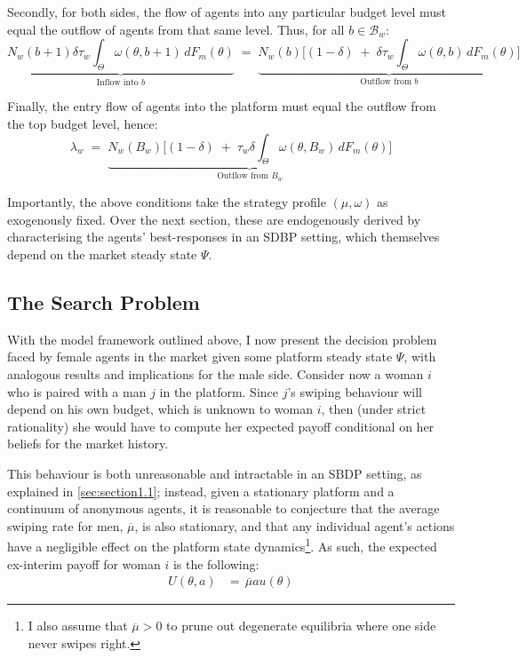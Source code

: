 Secondly, for both sides, the flow of agents into any particular budget level must equal the outflow of agents from that same level. Thus, for all $b\in\mathcal{B}_w$: 
\begin{equation}\label{eq:ss2} 
    \underbrace{N_w(b+1) \delta \tau_w \int_{\Theta} \omega(\theta,b+1)\,dF_{m}(\theta)}_{\text{Inflow into $b$}} \;=\; \underbrace{N_w(b) \Big[ (1-\delta) \;+\; \delta \tau_w\int_{\Theta} \omega(\theta,b)\,dF_{m}(\theta)\Big]}_{\text{Outflow from $b$}}
\end{equation}

Finally, the entry flow of agents into the platform must equal the outflow from the top budget level, hence: 
\begin{equation}\label{eq:ss3} 
    \lambda_w \;=\; \underbrace{N_w(B_w) \Big[ (1-\delta) \;+\; \tau_w \delta \int_{\Theta} \omega(\theta,B_w)\,dF_{m}(\theta) \Big]}_{\text{Outflow from $B_w$}}
\end{equation} 

Importantly, the above conditions take the strategy profile $(\mu,\omega)$ as exogenously fixed. Over the next section, these are endogenously derived by characterising the agents’ best-responses in an SDBP setting, which themselves depend on the market steady state $\Psi$.

\subsection{The Search Problem}\label{sec:section2.3}
With the model framework outlined above, I now present the decision problem faced by female agents in the market given some platform steady state $\Psi$, with analogous results and implications for the male side. 
Consider now a woman $i$ who is paired with a man $j$ in the platform. Since $j$'s swiping behaviour will depend on his own budget, which is unknown to woman $i$, then (under strict rationality) she would have to compute her expected payoff conditional on her beliefs for the market history.

This behaviour is both unreasonable and intractable in an SBDP setting, as explained in \autoref{sec:section1.1}; instead, given a stationary platform and a continuum of anonymous agents, it is reasonable to conjecture that the average swiping rate for men, $\overline\mu$, is also stationary, and that any individual agent's actions have a negligible effect on the platform state dynamics\footnote{I also assume that $\overline\mu>0$ to prune out degenerate equilibria where one side never swipes right.}.
As such, the expected ex-interim payoff for woman $i$ is the following:
\begin{equation*}
    \begin{aligned}
        U(\theta, a)&= \,\overline{\mu} a u(\theta)%
    \end{aligned} 
\end{equation*} 

